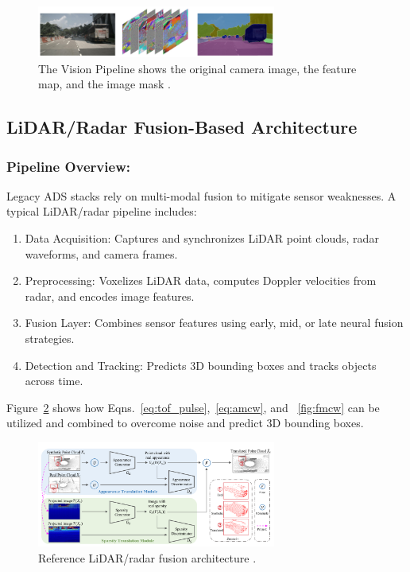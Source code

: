 \documentclass[12pt]{article}
\begin{document}
\begin{figure}[H]
	\centering
	\includegraphics[width=0.7\textwidth]{masking}
	\caption{The Vision Pipeline shows the original camera image, the feature map,
	and the image mask \cite{wang2024}.}
	\label{fig:visionpipe}
\end{figure}

\subsection{LiDAR/Radar Fusion-Based Architecture}

\subsubsection{Pipeline Overview:}

Legacy ADS stacks rely on multi-modal fusion to mitigate sensor weaknesses. A typical LiDAR/radar pipeline includes:

\begin{enumerate}[label=\alph*), nosep]
  \item Data Acquisition: Captures and synchronizes LiDAR point clouds, radar waveforms, and camera frames.
  \item Preprocessing: Voxelizes LiDAR data, computes Doppler velocities from radar, and encodes image features.
  \item Fusion Layer: Combines sensor features using early, mid, or late neural fusion strategies.
  \item Detection and Tracking: Predicts 3D bounding boxes and tracks objects across time.
\end{enumerate}
Figure~\ref{fig:lidarstack} shows how
Eqns.~\ref{eq:tof_pulse},~\ref{eq:amcw}, and ~\ref{fig:fmcw} can be utilized and
combined to overcome noise and predict 3D bounding boxes.

\begin{figure}[H]
	\centering
	\includegraphics[width=0.7\textwidth]{lidararchitecture}
	\caption{Reference LiDAR/radar fusion architecture \autocite{Haghighi2024}.}
	\label{fig:lidarstack}
\end{figure}
\end{document}
